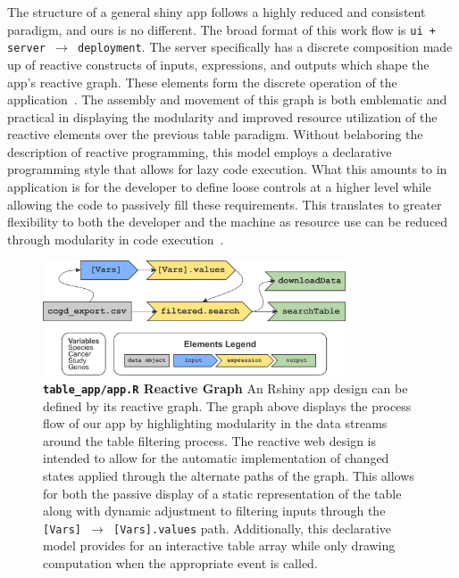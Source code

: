 \documentclass[10pt]{report}
\begin{document}
The structure of a general shiny app follows a highly reduced and consistent paradigm, and ours is no different. The broad format of this work flow is \texttt{ui + server $\rightarrow$ deployment}. The server specifically has a discrete composition made up of reactive constructs of inputs, expressions, and outputs which shape the app's reactive graph. These elements form the discrete operation of the application~\cite{wickhamMasteringShinyBook}. The assembly and movement of this graph is both emblematic and practical in displaying the modularity and improved resource utilization of the reactive elements over the previous table paradigm. Without belaboring the description of reactive programming, this model employs a declarative programming style that allows for lazy code execution. What this amounts to in application is for the developer to define loose controls at a higher level while allowing the code to passively fill these requirements. This translates to greater flexibility to both the developer and the machine as resource use can be reduced through modularity in code execution~\cite{jwlloydPracticalAdvantagesDeclarative1994}.

\begin{figure}[H]
    \center{}
    \includegraphics[width=0.8\textwidth]{fig/reactive_graph.pdf}
    \caption[\texttt{table\_app/app.R} Reactive Graph]{\textbf{\texttt{table\_app/app.R} Reactive Graph} An Rshiny app design can be defined by its reactive graph. The graph above displays the process flow of our app by highlighting modularity in the data streams around the table filtering process. The reactive web design is intended to allow for the automatic implementation of changed states applied through the alternate paths of the graph. This allows for both the passive display of a static representation of the table along with dynamic adjustment to filtering inputs through the \texttt{[Vars] $\rightarrow$ [Vars].values} path. Additionally, this declarative model provides for an interactive table array while only drawing computation when the appropriate event is called.}\label{fig:reactiveGraph}
\end{figure}
\end{document}
